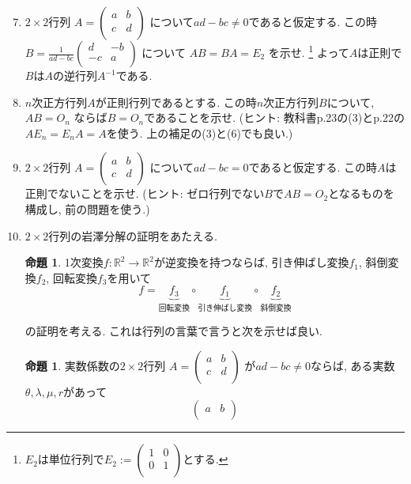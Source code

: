 \documentclass[dvipdfmx,a4paper,11pt]{article} %
\newcommand{\R}{\mathbb{R}}
\theoremstyle{definition}
\newtheorem{prop}[thm]{命題}
\begin{document}
 \begin{enumerate}[label=\textbf{問題}\arabic*.]
 \setcounter{enumi}{6}
\item $2 \times 2$行列
$A=\begin{pmatrix}
a & b\\
c & d \\
\end{pmatrix}
$
について$ad - bc \neq0$であると仮定する.
この時
$
B=\frac{1}{ad-bc}
\begin{pmatrix}
d & -b\\
-c & a \\
\end{pmatrix}
$
について
$
AB=BA=E_2
$
を示せ. \footnote{$E_2$は単位行列で$E_2:=\begin{pmatrix}
1 & 0\\
0 & 1 \\
\end{pmatrix}$とする. }
よって$A$は正則で$B$は$A$の逆行列$A^{-1}$である.
\item $n$次正方行列$A$が正則行列であるとする.
この時$n$次正方行列$B$について, 
$AB=O_{n}$
ならば$B=O_n$であることを示せ.
(ヒント: 教科書p.23の(3)とp.22の$AE_n=E_nA=A$を使う. 上の補足の(3)と(6)でも良い.)
\item $2 \times 2$行列
$A=\begin{pmatrix}
a & b\\
c & d \\
\end{pmatrix}
$
について$ad - bc =0$であると仮定する.
この時$A$は正則でないことを示せ.
(ヒント: ゼロ行列でない$B$で$AB=O_2$となるものを構成し, 前の問題を使う.)
 \item $2 \times 2$行列の岩澤分解の証明をあたえる. 
\begin{prop}\cite[命題 1.2.4 (岩澤分解)]{O}
1次変換$f : \R^2 \to \R^2$が逆変換を持つならば, 
引き伸ばし変換$f_1$, 斜倒変換$f_2$, 回転変換$f_3$を用いて
$$
f=\underbrace{f_{3}}_{\text{回転変換}} \circ \underbrace{f_1}_{\text{引き伸ばし変換}} \circ \underbrace{f_2}_{\text{斜倒変換}}
$$
\end{prop}
の証明を考える. 
これは行列の言葉で言うと次を示せば良い. 
\begin{prop}
実数係数の$2 \times 2$行列
$
A=\begin{pmatrix}
a & b\\
c & d \\
\end{pmatrix}
$
が$ad-bc \neq0$ならば, ある実数$\theta, \lambda,\mu, r$があって
$$
\begin{pmatrix}
a & b\\

\end{pmatrix}$$
\end{prop}
\end{enumerate}
\end{document}
